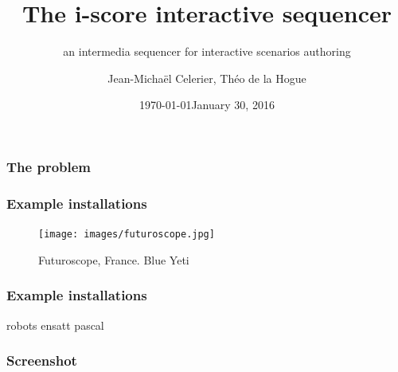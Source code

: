 \documentclass{beamer}
\title{The i-score interactive sequencer}
\subtitle{an intermedia sequencer for interactive scenarios authoring}
\date{\today}
\author{Jean-Michaël Celerier, Théo de la Hogue}
\institute{LaBRI, Blue Yeti, GMEA }
\date{January 30, 2016}
\begin{document}
    
\maketitle

\begin{frame}
    \frametitle{The problem}        
\end{frame}

\begin{frame}
    \frametitle{Example installations}        

    \begin{figure}
        \centering
        \texttt{[image: images/futuroscope.jpg]}
        \caption[]{Futuroscope, France. Blue Yeti}
    \end{figure}
\end{frame}


\begin{frame}
    \frametitle{Example installations}        
    robots
    ensatt
    pascal
    
\end{frame}

\begin{frame}
    \frametitle{Screenshot}        
\end{frame}
\end{document}
